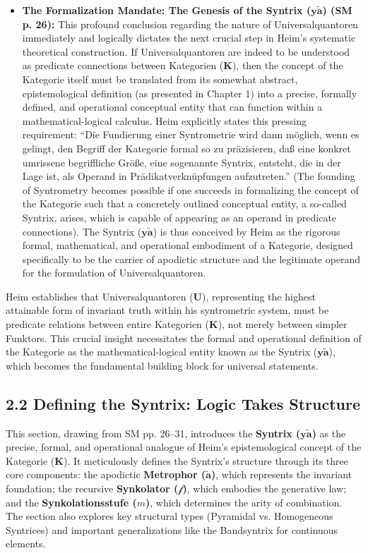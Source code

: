 \documentclass[12pt]{article}
\newcommand{\q}[1]{\enquote{#1}}
\newcommand{\kategorie}{\bm{K}}
\newcommand{\syntrix}{\bm{y\widetilde{a}}}
\newcommand{\metrophor}{\bm{\widetilde{a}}}
\newcommand{\synkolator}{\mathcal{f}}
\newcommand{\synkolationsstufe}{m}
\newcommand{\universalquantor}{\bm{U}}
\begin{document}
\begin{itemize}
    \item \textbf{The Formalization Mandate: The Genesis of the Syntrix (\(\syntrix\)) (SM p. 26):}
    This profound conclusion regarding the nature of Universalquantoren immediately and logically dictates the next crucial step in Heim's systematic theoretical construction. If Universalquantoren are indeed to be understood as predicate connections between Kategorien (\(\kategorie\)), then the concept of the Kategorie itself must be translated from its somewhat abstract, epistemological definition (as presented in Chapter 1) into a precise, formally defined, and operational conceptual entity that can function within a mathematical-logical calculus. Heim explicitly states this pressing requirement: \q{Die Fundierung einer Syntrometrie wird dann möglich, wenn es gelingt, den Begriff der Kategorie formal so zu präzisieren, daß eine konkret umrissene begriffliche Größe, eine sogenannte Syntrix, entsteht, die in der Lage ist, als Operand in Prädikatverknüpfungen aufzutreten.} (The founding of Syntrometry becomes possible if one succeeds in formalizing the concept of the Kategorie such that a concretely outlined conceptual entity, a so-called Syntrix, arises, which is capable of appearing as an operand in predicate connections). The Syntrix (\(\syntrix\)) is thus conceived by Heim as the rigorous formal, mathematical, and operational embodiment of a Kategorie, designed specifically to be the carrier of apodictic structure and the legitimate operand for the formulation of Universalquantoren.
\end{itemize}

Heim establishes that Universalquantoren (\(\universalquantor\)), representing the highest attainable form of invariant truth within his syntrometric system, must be predicate relations between entire Kategorien (\(\kategorie\)), not merely between simpler Funktors. This crucial insight necessitates the formal and operational definition of the Kategorie as the mathematical-logical entity known as the Syntrix (\(\syntrix\)), which becomes the fundamental building block for universal statements.

\subsection{2.2 Defining the Syntrix: Logic Takes Structure}
\label{sec:syntrix_definition}

This section, drawing from SM pp. 26--31, introduces the \textbf{Syntrix (\(\syntrix\))} as the precise, formal, and operational analogue of Heim's epistemological concept of the Kategorie (\(\kategorie\)). It meticulously defines the Syntrix's structure through its three core components: the apodictic \textbf{Metrophor (\(\metrophor\))}, which represents the invariant foundation; the recursive \textbf{Synkolator (\(\synkolator\))}, which embodies the generative law; and the \textbf{Synkolationsstufe (\(\synkolationsstufe\))}, which determines the arity of combination. The section also explores key structural types (Pyramidal vs. Homogeneous Syntrices) and important generalizations like the Bandsyntrix for continuous elements.
\end{document}
